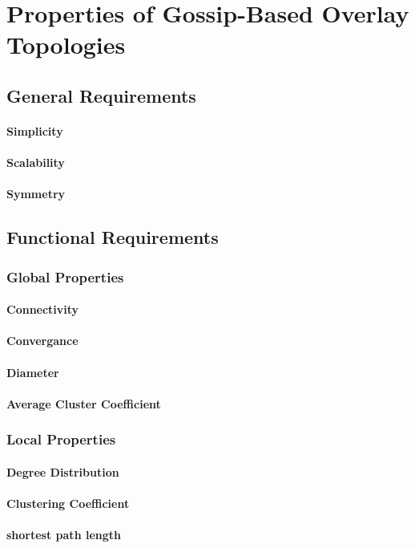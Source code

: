 \chapter{Properties of Gossip-Based Overlay Topologies} 
\label{chap:propertiess}

\section{General Requirements}
\subsubsection{Simplicity}
\subsubsection{Scalability}
\subsubsection{Symmetry}

\section{Functional Requirements}

\subsection{Global Properties}

\subsubsection{Connectivity}
\subsubsection{Convergance}
\subsubsection{Diameter}
\subsubsection{Average Cluster Coefficient}

\subsection{Local Properties}

\subsubsection{Degree Distribution}
\subsubsection{Clustering Coefficient}
\subsubsection{shortest path length}